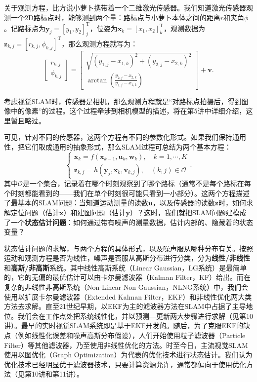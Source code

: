 关于观测方程，比方说小萝卜携带着一个二维激光传感器。我们知道激光传感器观测一个2D路标点时，能够测到两个量：路标点与小萝卜本体之间的距离$r$和夹角$\phi$。记路标点为$\bm{y}_j = [y_1, y_2]_j^\mathrm{T}$，位姿为$\bm{x}_k=[x_1,x_2]_k^\mathrm{T}$，观测数据为$\bm{z}_{k,j} = [r_{k,j}, \phi_{k,j}]^\mathrm{T}$，那么观测方程就写为：
\begin{equation}
\left[ \begin{array}{l}
r_{k,j}\\
\phi_{k,j}
\end{array} \right] = \left[ \begin{array}{l}
\sqrt {{{\left(y_{1,j} - x_{1,k} \right)}^2} + {{\left( {{y_{2,j}} - x_{2,k}} \right)}^2}} \\
\arctan \left( \frac{{y_{2,j}} - x_{2,k}}{{y_{1,j} - x_{1,k}}} \right)
\end{array} \right] + \bm{v}.
\end{equation}

考虑视觉SLAM时，传感器是相机，那么观测方程就是“对路标点拍摄后，得到图像中的像素”的过程。这个过程牵涉到相机模型的描述，将在第5讲中详细介绍，这里暂且略过。

可见，针对不同的传感器，这两个方程有不同的参数化形式。如果我们保持通用性，把它们取成通用的抽象形式，那么SLAM过程可总结为两个基本方程：
\begin{equation}
\label{eq:slamproblem}
\left\{ \begin{array}{l}
{\bm{x}_k} = f\left( {{\bm{x}_{k - 1}},{\bm{u}_k}}, \bm{w}_k \right),\quad k=1,\cdots, K\\
{\bm{z}_{k,j}} = h\left( {{ \bm{y}_j},{ \bm{x}_k}}, \bm{v}_{k,j} \right), \quad (k,j) \in \mathcal{O}
\end{array} \right. .
\end{equation}
其中$\mathcal{O}$是一个集合，记录着在哪个时刻观察到了哪个路标（通常不是每个路标在每个时刻都能看到的——我们在单个时刻很可能只看到一小部分）。这两个方程描述了最基本的SLAM问题：当知道运动测量的读数$\bm{u}$，以及传感器的读数$\bm{z}$时，如何求解定位问题（估计$\bm{x}$）和建图问题（估计$\bm{y}$）？这时，我们就把SLAM问题建模成了一个\textbf{状态估计问题}：如何通过带有噪声的测量数据，估计内部的、隐藏着的状态变量？

状态估计问题的求解，与两个方程的具体形式，以及噪声服从哪种分布有关。按照运动和观测方程是否为线性，噪声是否服从高斯分布进行分类，分为\textbf{线性/非线性}和\textbf{高斯/非高斯}系统。其中线性高斯系统（Linear Gaussian，LG系统）是最简单的，它的无偏的最优估计可以由卡尔曼滤波器（Kalman Filter，KF）给出。而在复杂的非线性非高斯系统（Non-Linear Non-Gaussian，NLNG系统）中，我们会使用以扩展卡尔曼滤波器（Extended Kalman Filter，EKF）和非线性优化两大类方法去求解。直至21世纪早期，以EKF为主的滤波器方法在SLAM中占据了主导地位。我们会在工作点处把系统线性化，并以预测—更新两大步骤进行求解（见第10讲）。最早的实时视觉SLAM系统即是基于EKF\textsuperscript{\cite{Davison2007}}开发的。随后，为了克服EKF的缺点（例如线性化误差和噪声高斯分布假设），人们开始使用粒子滤波器（Particle Filter）等其他滤波器，乃至使用非线性优化的方法。时至今日，主流视觉SLAM使用以图优化（Graph Optimization）为代表的优化技术进行状态估计\textsuperscript{\cite{Strasdat2012}}。我们认为优化技术已经明显优于滤波器技术，只要计算资源允许，通常都偏向于使用优化方法（见第10讲和第11讲）。

